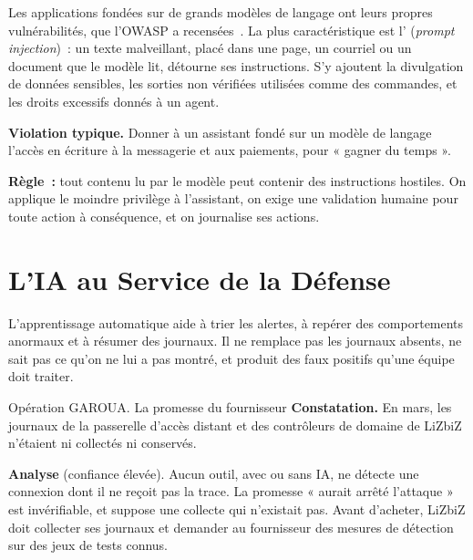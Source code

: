 Les applications fondées sur de grands modèles de langage ont leurs
propres vulnérabilités, que l'OWASP a recensées~\cite{owasp2023llm}. La
plus caractéristique est l' (\textit{prompt
injection})~: un texte malveillant, placé dans une page, un courriel ou un
document que le modèle lit, détourne ses instructions. S'y ajoutent la
divulgation de données sensibles, les sorties non vérifiées utilisées
comme des commandes, et les droits excessifs donnés à un agent.

\begin{boxalert}
\textbf{Violation typique.} Donner à un assistant fondé sur un modèle de
langage l'accès en écriture à la messagerie et aux paiements, pour
« gagner du temps ».

\smallskip
\textbf{Règle~:} tout contenu lu par le modèle peut contenir des
instructions hostiles. On applique le moindre privilège à l'assistant,
on exige une validation humaine pour toute action à conséquence, et on
journalise ses actions.
\end{boxalert}

\section{L'IA au Service de la Défense}
\label{sec:c25-defense}

L'apprentissage automatique aide à trier les alertes, à repérer des
comportements anormaux et à résumer des journaux. Il ne remplace pas les
journaux absents, ne sait pas ce qu'on ne lui a pas montré, et produit des
faux positifs qu'une équipe doit traiter.

\begin{boxscenario}{Opération GAROUA. La promesse du fournisseur}
\textbf{Constatation.} En mars, les journaux de la passerelle d'accès
distant et des contrôleurs de domaine de LiZbiZ n'étaient ni collectés ni
conservés.

\medskip
\textbf{Analyse} (confiance élevée). Aucun outil, avec ou sans IA, ne
détecte une connexion dont il ne reçoit pas la trace. La promesse « aurait
arrêté l'attaque » est invérifiable, et suppose une collecte qui
n'existait pas. Avant d'acheter, LiZbiZ doit collecter ses journaux et
demander au fournisseur des mesures de détection sur des jeux de tests
connus.
\end{boxscenario}

